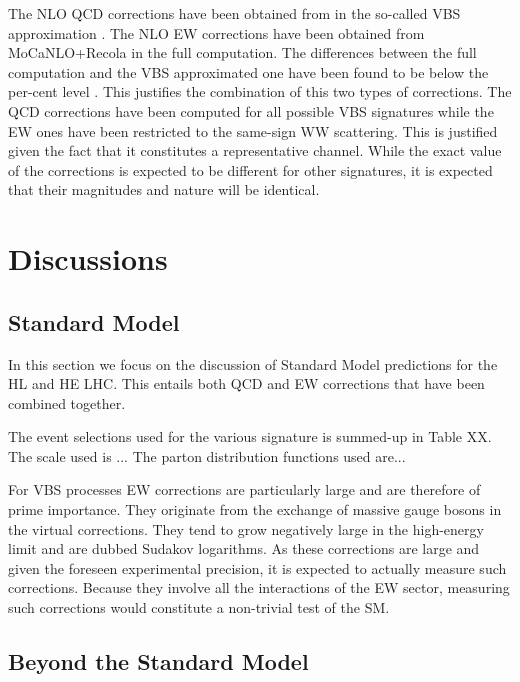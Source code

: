 \documentclass[11pt,epsf]{article}
\newcommand{\MP}[1]{{ {\color{blue}{ [MP: #1]}} }}
\begin{document}
The NLO QCD corrections have been obtained from \cite{Arnold:2008rz, Arnold:2011wj, Baglio:2014uba} in the so-called VBS approximation \cite{Ballestrero:2018anz}.
The NLO EW corrections have been obtained from MoCaNLO+Recola \cite{Actis:2016mpe,Actis:2016mpe} in the full computation.
The differences between the full computation and the VBS approximated one have been found to be below the per-cent level \cite{Ballestrero:2018anz}.
This justifies the combination of this two types of corrections.
The QCD corrections have been computed for all possible VBS signatures while the EW ones have been restricted to the same-sign WW scattering.
This is justified given the fact that it constitutes a representative channel.
While the exact value of the corrections is expected to be different for other signatures, it is expected that their magnitudes and nature will be identical.

\section{Discussions}

\subsection{Standard Model}

In this section we focus on the discussion of Standard Model predictions for the HL and HE LHC.
This entails both QCD and EW corrections that have been combined together.

The event selections used for the various signature is summed-up in Table XX.
The scale used is ...
The parton distribution functions used are...

For VBS processes EW corrections are particularly large and are therefore of prime importance.
They originate from the exchange of massive gauge bosons in the virtual corrections.
They tend to grow negatively large in the high-energy limit and are dubbed Sudakov logarithms.
As these corrections are large and given the foreseen experimental precision, it is expected to actually measure such corrections.
Because they involve all the interactions of the EW sector, measuring such corrections would constitute a non-trivial test of the SM.

\subsection{Beyond the Standard Model}

\MP{I left the set-up section for completeness but we should probably omit it in the final version}
\end{document}
